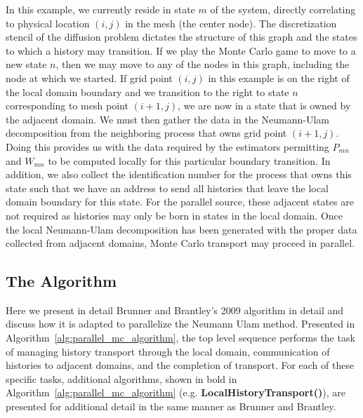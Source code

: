 In this example, we currently reside in state $m$ of the system,
directly correlating to physical location $(i,j)$ in the mesh (the
center node). The discretization stencil of the diffusion problem
dictates the structure of this graph and the states to which a history
may transition. If we play the Monte Carlo game to move to a new state
$n$, then we may move to any of the nodes in this graph, including the
node at which we started. If grid point $(i,j)$ in this example is on
the right of the local domain boundary and we transition to the right
to state $n$ corresponding to mesh point $(i+1,j)$, we are now in a
state that is owned by the adjacent domain. We must then gather the
data in the Neumann-Ulam decomposition from the neighboring process
that owns grid point $(i+1,j)$. Doing this provides us with the data
required by the estimators permitting $P_{mn}$ and $W_{mn}$ to be
computed locally for this particular boundary transition. In addition,
we also collect the identification number for the process that owns
this state such that we have an address to send all histories that
leave the local domain boundary for this state. For the parallel
source, these adjacent states are not required as histories may only
be born in states in the local domain. Once the local Neumann-Ulam
decomposition has been generated with the proper data collected from
adjacent domains, Monte Carlo transport may proceed in parallel.

\clearpage

\subsection{The Algorithm}
\label{subsec:parallel_mc_algorithm}

Here we present in detail Brunner and Brantley's 2009 algorithm in
detail and discuss how it is adapted to parallelize the Neumann Ulam
method. Presented in Algorithm~\ref{alg:parallel_mc_algorithm}, the
top level sequence performs the task of managing history transport
through the local domain, communication of histories to adjacent
domains, and the completion of transport. For each of these specific
tasks, additional algorithms, shown in bold in
Algorithm~\ref{alg:parallel_mc_algorithm}
(e.g. \textbf{LocalHistoryTransport()}), are presented for additional
detail in the same manner as Brunner and Brantley.

